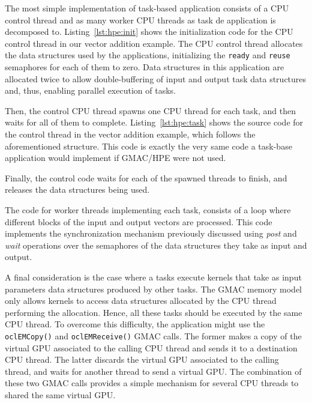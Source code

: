 

The most simple implementation of task\hyp{}based application consists of a CPU control thread and 
as many worker CPU threads as task de application is decomposed to. Listing~\ref{lst:hpe:init} shows 
the initialization code for the CPU control thread in our vector addition example. The CPU control 
thread allocates the data structures used by the applications, initializing the \texttt{ready} and 
\texttt{reuse} semaphores for each of them to zero. Data structures in this application are 
allocated twice to allow double\hyp{}buffering of input and output task data structures and, thus, 
enabling parallel execution of tasks.



Then, the control CPU thread spawns one CPU thread for each task, and then waits for all of them to 
complete. Listing~\ref{lst:hpe:task} shows the source code for the control thread in the vector 
addition example, which follows the aforementioned structure. This code is exactly the very same 
code a task\hyp{}base application would implement if GMAC\slash HPE were not used.


Finally, the control code waits for each of the spawned threads to finish, and releases the data 
structures being used.

The code for worker threads implementing each task, consists of a loop where different blocks of the 
input and output vectors are processed. This code implements the synchronization mechanism 
previously discussed using \emph{post} and \emph{wait} operations over the semaphores of the data 
structures they take as input and output.

A final consideration is the case where a tasks execute kernels that take as input parameters data 
structures produced by other tasks. The GMAC memory model only allows kernels to access data 
structures allocated by the CPU thread performing the allocation. Hence, all these tasks should be 
executed by the same CPU thread. To overcome this difficulty, the application might use the
\texttt{oclEMCopy()} and \texttt{oclEMReceive()} GMAC calls. The former makes a copy of the virtual 
GPU associated to the calling CPU thread and sends it to a destination CPU thread. The latter 
discards the virtual GPU associated to the calling thread, and waits for another thread to send a 
virtual GPU\@. The combination of these two GMAC calls provides a simple mechanism for several CPU 
threads to shared the same virtual GPU.

